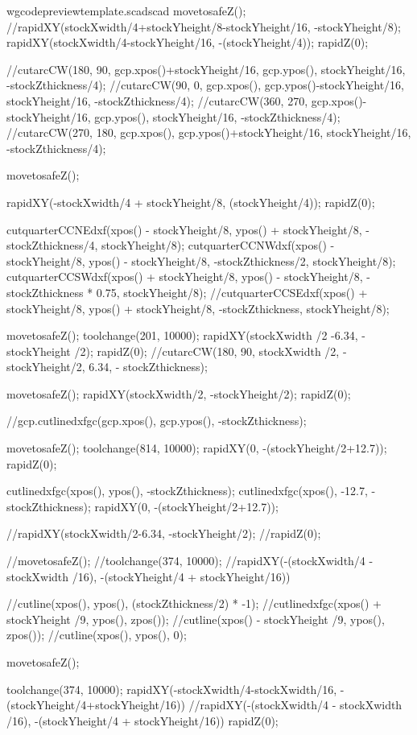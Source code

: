 \documentclass{ltxdoc}
\begin{document}
\begin{writecode}{w}{gcodepreviewtemplate.scad}{scad}
movetosafeZ();
//rapidXY(stockXwidth/4+stockYheight/8-stockYheight/16, -stockYheight/8);
rapidXY(stockXwidth/4-stockYheight/16, -(stockYheight/4));
rapidZ(0);

//cutarcCW(180, 90, gcp.xpos()+stockYheight/16, gcp.ypos(), stockYheight/16, -stockZthickness/4);
//cutarcCW(90, 0, gcp.xpos(), gcp.ypos()-stockYheight/16, stockYheight/16, -stockZthickness/4);
//cutarcCW(360, 270, gcp.xpos()-stockYheight/16, gcp.ypos(), stockYheight/16, -stockZthickness/4);
//cutarcCW(270, 180, gcp.xpos(), gcp.ypos()+stockYheight/16, stockYheight/16, -stockZthickness/4);

movetosafeZ();

rapidXY(-stockXwidth/4 + stockYheight/8, (stockYheight/4));
rapidZ(0);

cutquarterCCNEdxf(xpos() - stockYheight/8, ypos() + stockYheight/8, -stockZthickness/4, stockYheight/8);
cutquarterCCNWdxf(xpos() - stockYheight/8, ypos() - stockYheight/8, -stockZthickness/2, stockYheight/8);
cutquarterCCSWdxf(xpos() + stockYheight/8, ypos() - stockYheight/8, -stockZthickness * 0.75, stockYheight/8);
//cutquarterCCSEdxf(xpos() + stockYheight/8, ypos() + stockYheight/8, -stockZthickness, stockYheight/8);

movetosafeZ();
toolchange(201, 10000);
rapidXY(stockXwidth /2 -6.34, - stockYheight /2);
rapidZ(0);
//cutarcCW(180, 90, stockXwidth /2, -stockYheight/2, 6.34, - stockZthickness);

movetosafeZ();
rapidXY(stockXwidth/2, -stockYheight/2);
rapidZ(0);

//gcp.cutlinedxfgc(gcp.xpos(), gcp.ypos(), -stockZthickness);

movetosafeZ();
toolchange(814, 10000);
rapidXY(0, -(stockYheight/2+12.7));
rapidZ(0);

cutlinedxfgc(xpos(), ypos(), -stockZthickness);
cutlinedxfgc(xpos(), -12.7, -stockZthickness);
rapidXY(0, -(stockYheight/2+12.7));

//rapidXY(stockXwidth/2-6.34, -stockYheight/2);
//rapidZ(0);

//movetosafeZ();
//toolchange(374, 10000);
//rapidXY(-(stockXwidth/4 - stockXwidth /16), -(stockYheight/4 + stockYheight/16))

//cutline(xpos(), ypos(), (stockZthickness/2) * -1);
//cutlinedxfgc(xpos() + stockYheight /9, ypos(), zpos());
//cutline(xpos() - stockYheight /9, ypos(), zpos());
//cutline(xpos(), ypos(), 0);

movetosafeZ();

toolchange(374, 10000);
rapidXY(-stockXwidth/4-stockXwidth/16, -(stockYheight/4+stockYheight/16))
//rapidXY(-(stockXwidth/4 - stockXwidth /16), -(stockYheight/4 + stockYheight/16))
rapidZ(0);


\end{writecode}
\end{document}
